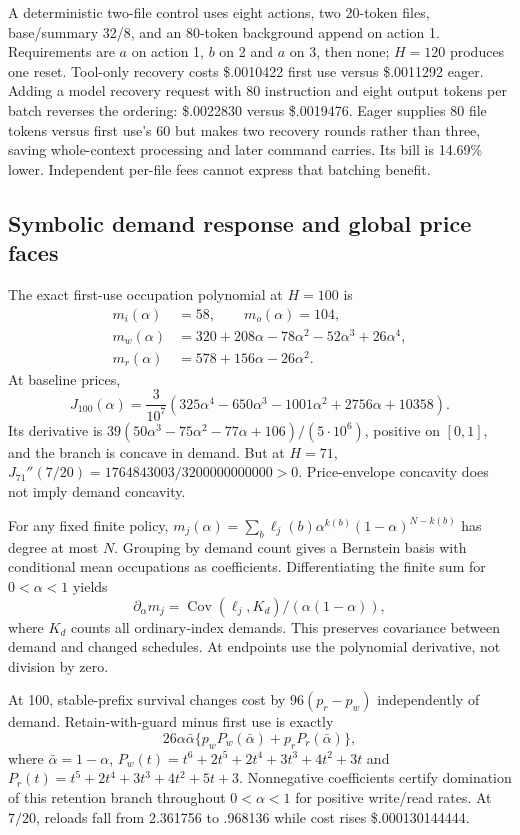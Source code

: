 \documentclass[sigconf,screen,nonacm]{acmart}
\begin{document}
A deterministic two-file control uses eight actions, two 20-token files,
base/summary 32/8, and an 80-token background append on action 1.
Requirements are $a$ on action 1, $b$ on 2 and $a$ on 3, then none;
$H=120$ produces one reset. Tool-only recovery costs \$.0010422 first
use versus \$.0011292 eager. Adding a model recovery request with 80
instruction and eight output tokens per batch reverses the ordering:
\$.0022830 versus \$.0019476. Eager supplies 80 file tokens versus
first use's 60 but makes two recovery rounds rather than three, saving
whole-context processing and later command carries. Its bill is 14.69\%
lower. Independent per-file fees cannot express that batching benefit.

\subsection{Symbolic demand response and global price faces}
The exact first-use occupation polynomial at $H=100$ is
\begin{align}
m_i(\alpha)&=58,\qquad m_o(\alpha)=104,\\
m_w(\alpha)&=320+208\alpha-78\alpha^2-52\alpha^3+26\alpha^4,\\
m_r(\alpha)&=578+156\alpha-26\alpha^2.
\end{align}
At baseline prices,
\begin{equation}
J_{100}(\alpha)=\frac3{10^7}
(325\alpha^4-650\alpha^3-1001\alpha^2+2756\alpha+10358).
\end{equation}
Its derivative is
$39(50\alpha^3-75\alpha^2-77\alpha+106)/(5\cdot10^6)$, positive
on $[0,1]$, and the branch is concave in demand. But at $H=71$,
$J_{71}''(7/20)=1764843003/3200000000000>0$.
Price-envelope concavity does not imply demand concavity.

For any fixed finite policy,
$m_j(\alpha)=\sum_b\ell_j(b)\alpha^{k(b)}(1-\alpha)^{N-k(b)}$
has degree at most $N$. Grouping by demand count gives a Bernstein basis
with conditional mean occupations as coefficients. Differentiating the
finite sum for $0<\alpha<1$ yields
\begin{equation}
\partial_\alpha m_j=
\operatorname{Cov}(\ell_j,K_d)/(\alpha(1-\alpha)),
\label{eq:demand-score}
\end{equation}
where $K_d$ counts all ordinary-index demands. This preserves covariance
between demand and changed schedules. At endpoints use the polynomial
derivative, not division by zero.

At 100, stable-prefix survival changes cost by $96(p_r-p_w)$ independently
of demand. Retain-with-guard minus first use is exactly
\begin{equation}
26\alpha\bar\alpha\{p_wP_w(\bar\alpha)+p_rP_r(\bar\alpha)\},
\end{equation}
where $\bar\alpha=1-\alpha$,
$P_w(t)=t^6+2t^5+2t^4+3t^3+4t^2+3t$ and
$P_r(t)=t^5+2t^4+3t^3+4t^2+5t+3$.
Nonnegative coefficients certify domination of this retention branch
throughout $0<\alpha<1$ for positive write/read rates. At $7/20$,
reloads fall from 2.361756 to .968136 while cost rises \$.000130144444.
\end{document}
